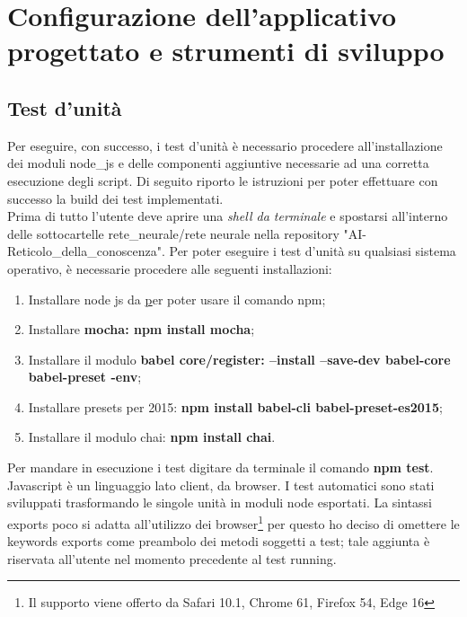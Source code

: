 \section{Configurazione dell'applicativo progettato e strumenti di sviluppo}

\subsection{Test d'unit\`a}
\label{Test d'unita}
Per eseguire, con successo, i test d'unità è necessario procedere all'installazione dei moduli node\_js e delle componenti aggiuntive necessarie ad una corretta esecuzione degli script. Di seguito riporto le istruzioni per poter effettuare con successo la build dei test implementati.\\
Prima di tutto l'utente deve aprire una \textit{shell da terminale} e spostarsi all'interno delle sottocartelle rete\_neurale/rete neurale nella repository "AI-Reticolo\_della\_conoscenza".
Per poter eseguire i test d'unit\`a su qualsiasi sistema operativo, \`e necessarie procedere alle seguenti installazioni:
\begin{enumerate}
 \item Installare node js da \href{https://nodejs.org/en/download/} per poter usare il comando npm;
 \item Installare \textbf{mocha: npm install mocha};
 \item Installare  il modulo \textbf{babel core/register: --install --save-dev babel-core babel-preset -env};
 \item Installare presets per 2015:  \textbf{npm install babel-cli babel-preset-es2015};
 \item Installare il modulo chai: \textbf{npm install chai}.
\end{enumerate}
\noindent
Per mandare in esecuzione i test digitare da terminale il comando \textbf{npm test}.\\
Javascript \`e un linguaggio lato client, da browser. I test automatici sono stati sviluppati trasformando le singole unit\`a in moduli node esportati. La sintassi exports poco si adatta all'utilizzo dei browser\footnote{Il supporto viene offerto da Safari 10.1, Chrome 61, Firefox 54, Edge 16} per questo ho deciso di omettere le keywords exports come preambolo dei metodi soggetti a test; tale aggiunta \`e riservata all'utente nel momento precedente al test running.

